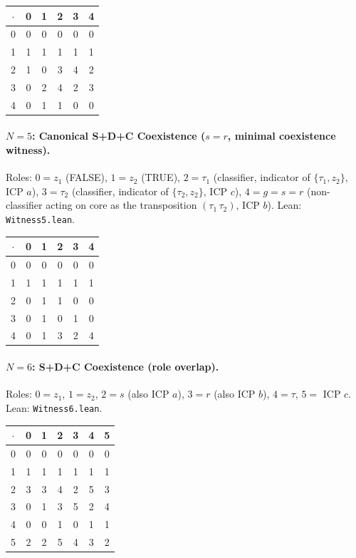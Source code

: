 \documentclass[sigconf,screen]{acmart}
\newcommand{\dotop}{\cdot}
\theoremstyle{remark}
\begin{document}
\medskip
{\small
\begin{tabular}{c|ccccc}
$\dotop$ & 0 & 1 & 2 & 3 & 4 \\\hline
0 & 0 & 0 & 0 & 0 & 0 \\
1 & 1 & 1 & 1 & 1 & 1 \\
2 & 1 & 0 & 3 & 4 & 2 \\
3 & 0 & 2 & 4 & 2 & 3 \\
4 & 0 & 1 & 1 & 0 & 0 \\
\end{tabular}}

\paragraph{$N\!=\!5$: Canonical S+D+C Coexistence ($s = r$, minimal coexistence witness).}
Roles: $0 = z_1$ (FALSE), $1 = z_2$ (TRUE), $2 = \tau_1$ (classifier, indicator of $\{\tau_1, z_2\}$, ICP $a$), $3 = \tau_2$ (classifier, indicator of $\{\tau_2, z_2\}$, ICP $c$), $4 = g = s = r$ (non-classifier acting on core as the transposition $(\tau_1\,\tau_2)$, ICP $b$). \quad Lean: \texttt{Witness5.lean}.

\medskip
{\small
\begin{tabular}{c|ccccc}
$\dotop$ & 0 & 1 & 2 & 3 & 4 \\\hline
0 & 0 & 0 & 0 & 0 & 0 \\
1 & 1 & 1 & 1 & 1 & 1 \\
2 & 0 & 1 & 1 & 0 & 0 \\
3 & 0 & 1 & 0 & 1 & 0 \\
4 & 0 & 1 & 3 & 2 & 4 \\
\end{tabular}}

\paragraph{$N\!=\!6$: S+D+C Coexistence (role overlap).}
Roles: $0 = z_1$, $1 = z_2$, $2 = s$ (also ICP $a$), $3 = r$ (also ICP $b$), $4 = \tau$, $5 =$ ICP $c$. \quad Lean: \texttt{Witness6.lean}.

\medskip
{\small
\begin{tabular}{c|cccccc}
$\dotop$ & 0 & 1 & 2 & 3 & 4 & 5 \\\hline
0 & 0 & 0 & 0 & 0 & 0 & 0 \\
1 & 1 & 1 & 1 & 1 & 1 & 1 \\
2 & 3 & 3 & 4 & 2 & 5 & 3 \\
3 & 0 & 1 & 3 & 5 & 2 & 4 \\
4 & 0 & 0 & 1 & 0 & 1 & 1 \\
5 & 2 & 2 & 5 & 4 & 3 & 2 \\
\end{tabular}}
\end{document}

